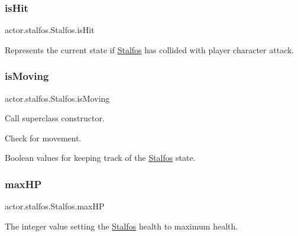 \subsubsection{\texorpdfstring{is\+Hit}{isHit}}
{\footnotesize\ttfamily actor.\+stalfos.\+Stalfos.\+is\+Hit}



Represents the current state if \hyperlink{classactor_1_1stalfos_1_1_stalfos}{Stalfos} has collided with player character attack. 

\mbox{\label{classactor_1_1stalfos_1_1_stalfos_a75c99c163e71b951ea617a47e2ed1dda}} 
\subsubsection{\texorpdfstring{is\+Moving}{isMoving}}
{\footnotesize\ttfamily actor.\+stalfos.\+Stalfos.\+is\+Moving}



Call superclass constructor. 

Check for movement.

Boolean values for keeping track of the \hyperlink{classactor_1_1stalfos_1_1_stalfos}{Stalfos} state. \mbox{\label{classactor_1_1stalfos_1_1_stalfos_a43fcf57e6c8f01de5789d44065645d63}} 
\subsubsection{\texorpdfstring{max\+HP}{maxHP}}
{\footnotesize\ttfamily actor.\+stalfos.\+Stalfos.\+max\+HP}



The integer value setting the \hyperlink{classactor_1_1stalfos_1_1_stalfos}{Stalfos} health to maximum health. 

\mbox{\label{classactor_1_1stalfos_1_1_stalfos_a359a06edb086b7c8a5c2092c53ee1e38}} 
